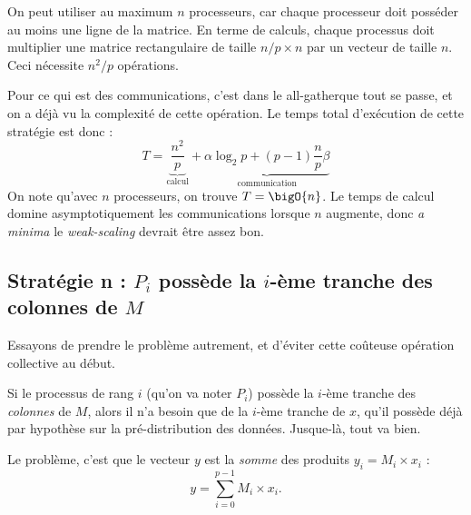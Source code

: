 On peut utiliser au maximum $n$ processeurs, car chaque processeur doit posséder
au moins une ligne de la matrice.  En terme de calculs, chaque processus doit
multiplier une matrice rectangulaire de taille $n/p \times n$ par un vecteur de
taille $n$. Ceci nécessite $n^2/p$ opérations.

Pour ce qui est des communications, c'est dans le \og all-gather\fg que tout se
passe, et on a déjà vu la complexité de cette opération. Le temps total
d'exécution de cette stratégie est donc :
\[
T= \underbrace{\frac{n^2}{p}}_{\text{calcul}} + \underbrace{\alpha \log_2 p + (p-1)\frac{n}{p} \beta}_{\text{communication}}
\]
On note qu'avec $n$ processeurs, on trouve $T= \bigO{n}$. Le temps de calcul
domine asymptotiquement les communications lorsque $n$ augmente, donc \textit{a
  minima} le \emph{weak-scaling} devrait être assez bon.


\subsection{Stratégie n : $P_i$ possède la $i$-ème tranche des
  colonnes de $M$}

Essayons de prendre le problème autrement, et d'éviter cette coûteuse
opération collective au début.

Si le processus de rang $i$ (qu'on va noter $P_i$) possède la $i$-ème
tranche des \emph{colonnes} de $M$, alors il n'a besoin que de la
$i$-ème tranche de $x$, qu'il possède déjà par hypothèse sur la
pré-distribution des données. \og Jusque-là, tout va bien\fg.

\begin{center}
\end{center}

Le problème, c'est que le vecteur $y$ est la \emph{somme} des produits
$y_i = M_i \times x_i$ :
\[
y = \sum_{i=0}^{p-1} M_i \times x_i.
\]

